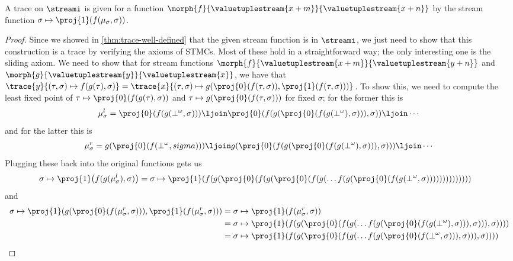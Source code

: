 \begin{theorem}
    A trace on \(\streami\) is given for a function \(
    \morph{f}{\valuetuplestream{x+m}}{\valuetuplestream{x+n}}
    \) by the stream function \(
    \sigma \mapsto \proj{1}(f(\mu_\sigma, \sigma))
    \).
\end{theorem}
\begin{proof}
    Since we showed in \cref{thm:trace-well-defined} that the given stream
    function is in \(\streami\), we just need to show that this construction is
    a trace by verifying the axioms of STMCs.
    Most of these hold in a straightforward way; the only interesting one is
    the sliding axiom.
    We need to show that for stream functions \(
    \morph{f}{\valuetuplestream{x+m}}{\valuetuplestream{y+n}}
    \) and \(
    \morph{g}{\valuetuplestream{y}}{\valuetuplestream{x}}
    \), we have that \(
    \trace{y}{(\tau, \sigma) \mapsto f(g(\tau), \sigma)}
    =
    \trace{x}{
        (\tau, \sigma)
        \mapsto
        g(\proj{0}\mleft(f(\tau, \sigma)\mright),
        \proj{1}\mleft(f(\tau, \sigma)\mright))
    }
    \).
    To show this, we need to compute the least fixed point of
    \(\tau \mapsto \proj{0}\mleft(f(g(\tau), \sigma)\mright)\) and
    \(\tau \mapsto g(\proj{0}\mleft(f(\tau, \sigma)\mright))\) for fixed \(\sigma\);
    for the former this is \[
        \mu_\sigma^l =
        \proj{0}\mleft(f(g(\bot^\omega, \sigma))\mright) \ljoin
        \proj{0}\mleft(f(g(\proj{0}\mleft(f(g(\bot^\omega), \sigma))\mright), \sigma)\mright) \ljoin
        \cdots\]
    and for the latter this is \[
        \mu_\sigma^r =
        g(\proj{0}\mleft(f(\bot^\omega, sigma)\mright)) \ljoin
        g(\proj{0}\mleft(f(g(\proj{0}\mleft(f(g(\bot^\omega), \sigma)\mright)), \sigma)\mright)) \ljoin
        \cdots
    \]
    Plugging these back into the original functions gets us \begin{align*}
        \sigma \mapsto \proj{1}\mleft(f(g(\mu_\sigma^l), \sigma)\mright)
         & =
        \sigma \mapsto \proj{1}\mleft(f(g(\proj{0}\mleft(f(g(\proj{0}\mleft(f(g(\dots f(g(\proj{0}\mleft(f(g(\bot^\omega, \sigma))\mright)))\mright)))\mright)))\mright)))
    \end{align*} and \begin{align*}
        \sigma \mapsto \proj{1}(g(\proj{0}(f(\mu_\sigma^r, \sigma))), \proj{1}(f(\mu_\sigma^r, \sigma)))
         & =
        \sigma \mapsto \proj{1}(f(\mu_\sigma^r, \sigma))
        \\
         & =
        \sigma \mapsto \proj{1}(f(
        g(\proj{0}\mleft(f(g(\dots f(g(\proj{0}\mleft(f(g(\bot^\omega), \sigma)\mright)), \sigma)\mright)), \sigma))))
        \\
         & =
        \sigma \mapsto \proj{1}(f(
        g(\proj{0}\mleft(f(g(\dots f(g(\proj{0}\mleft(f(\bot^\omega, \sigma)\mright)), \sigma)\mright)), \sigma))))
    \end{align*}
\end{proof}

